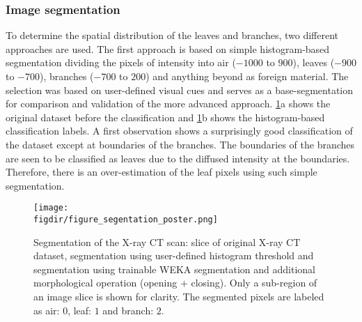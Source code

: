 \subsubsection*{Image segmentation}

To determine the spatial distribution of the leaves and branches, two different approaches are used. The first approach is based on simple histogram-based segmentation dividing the pixels of intensity into air ($-1000$ to $900$), leaves ($-900$ to $-700$), branches ($-700$ to $200$) and anything beyond as foreign material. The selection was based on user-defined visual cues and serves as a base-segmentation for comparison and validation of the more advanced approach. \cref{fig:xrayctslice}a shows the original dataset before the classification and \cref{fig:xrayctslice}b shows the histogram-based classification labels. A first observation shows a surprisingly good classification of the dataset except at boundaries of the branches. The boundaries of the branches are seen to be classified as leaves due to the diffused intensity at the boundaries. Therefore, there is an over-estimation of the leaf pixels using such simple segmentation.

	\begin{figure}[t]
		\centering
		\texttt{[image: \\figdir/figure\_segentation\_poster.png]}
		\caption{Segmentation of the X-ray CT scan:  slice of original X-ray CT dataset,  segmentation using user-defined histogram threshold and  segmentation using trainable WEKA segmentation and additional morphological operation (opening $+$ closing). Only a sub-region of an image slice is shown for clarity. The segmented pixels are labeled as air: $0$, leaf: $1$ and branch: $2$.}
		\label{fig:xrayctslice}
	\end{figure}

